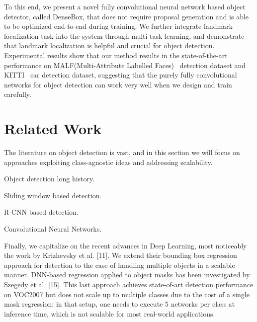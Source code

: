 To this end, we present a novel fully convolutional neural network based object detector, called DenseBox, that does not require proposal generation and is able to be optimized end-to-end during training. We further integrate landmark localization task into the system through multi-task learning, and demonstrate that landmark localization is helpful and crucial for object detection. Experimental results show that our method results in the state-of-the-art performance on MALF(Multi-Attribute Labelled Faces)~\cite{faceevaluation15} detection dataset and KITTI~\cite{Geiger2012CVPR} car detection dataset, suggesting that the purely fully convolutional networks for object detection can work very well when we design and train carefully. 

\section{Related Work}

The literature on object detection is vast, and in this section we will focus on approaches exploiting class-agnostic ideas and addressing scalability.

Object detection long history.

Sliding window based detection.

R-CNN based detection.

Convolutional Neural Networks.

Finally, we capitalize on the recent advances in Deep Learning, most noticeably the work by Krizhevsky et al. [11]. We extend their bounding box regression approach for detection to the case of handling multiple objects in a scalable manner. DNN-based regression applied to object masks has been investigated by Szegedy et al. [15]. This last approach achieves state-of-art detection performance on VOC2007 but does not scale up to multiple classes due to the cost of a single mask regression: in that setup, one needs to execute 5 networks per class at inference time, which is not scalable for most real-world applications.

